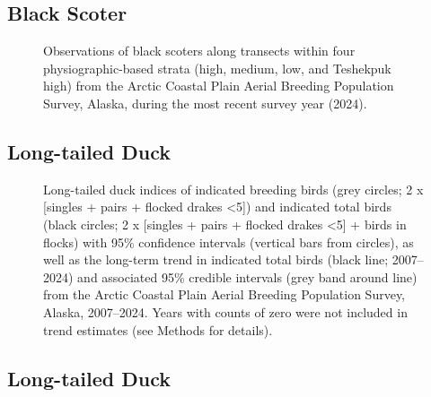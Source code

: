\documentclass[
]{article}
\begin{document}
\endgroup{}

\newpage{}

\subsection*{Black Scoter}\label{black-scoter-2}

\begin{figure}


\caption{\label{fig-BLSCmap}Observations of black scoters along
transects within four physiographic-based strata (high, medium, low, and
Teshekpuk high) from the Arctic Coastal Plain Aerial Breeding Population
Survey, Alaska, during the most recent survey year (2024).}

\end{figure}%

\newpage{}

\subsection*{Long-tailed Duck}\label{long-tailed-duck}

\begin{figure}


\caption{\label{fig-LTDU}Long-tailed duck indices of indicated breeding
birds (grey circles; 2 x {[}singles + pairs + flocked drakes
\textless5{]}) and indicated total birds (black circles; 2 x {[}singles
+ pairs + flocked drakes \textless5{]} + birds in flocks) with 95\%
confidence intervals (vertical bars from circles), as well as the
long-term trend in indicated total birds (black line; 2007--2024) and
associated 95\% credible intervals (grey band around line) from the
Arctic Coastal Plain Aerial Breeding Population Survey, Alaska,
2007--2024. Years with counts of zero were not included in trend
estimates (see Methods for details).}

\end{figure}%

\newpage{}

\subsection*{Long-tailed Duck}\label{long-tailed-duck-1}
\end{document}

